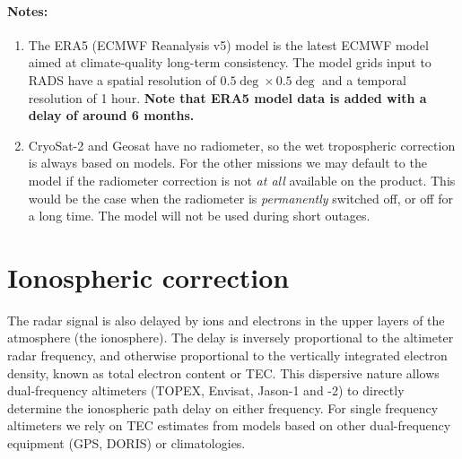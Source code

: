 \documentclass[a4paper,11pt,openany,natbib,nomargin]{thesis}
\newenvironment{notes}[1][Notes:]{\FloatBarrier\paragraph{#1}\begin{enumerate}}{\end{enumerate}}
\begin{document}
\begin{notes}
\item The ERA5 (ECMWF Reanalysis v5) model is the latest ECMWF model aimed at climate-quality long-term consistency. The model grids input to RADS have a spatial resolution of $0.5\deg\times 0.5\deg$ and a temporal resolution of 1 hour. \textbf{Note that ERA5 model data is added with a delay of around 6 months.}\label{item:wet_tropo_era5}
\item CryoSat-2 and Geosat have no radiometer, so the wet tropospheric correction is always based on models. For the other missions we may default to the model if the radiometer correction is not \emph{at all} available on the product. This would be the case when the radiometer is \emph{permanently} switched off, or off for a long time. The model will not be used during short outages.\label{item:wet_tropo}
\end{notes}

\section{Ionospheric correction}
The radar signal is also delayed by ions and electrons in the upper layers of the atmosphere (the ionosphere). The delay is inversely proportional to the altimeter radar frequency, and otherwise proportional to the vertically integrated electron density, known as total electron content or TEC. This dispersive nature allows dual-frequency altimeters (TOPEX, Envisat, Jason-1 and -2) to directly determine the ionospheric path delay on either frequency. For single frequency altimeters we rely on TEC estimates from models based on other dual-frequency equipment (GPS, DORIS) or climatologies.
\end{document}
